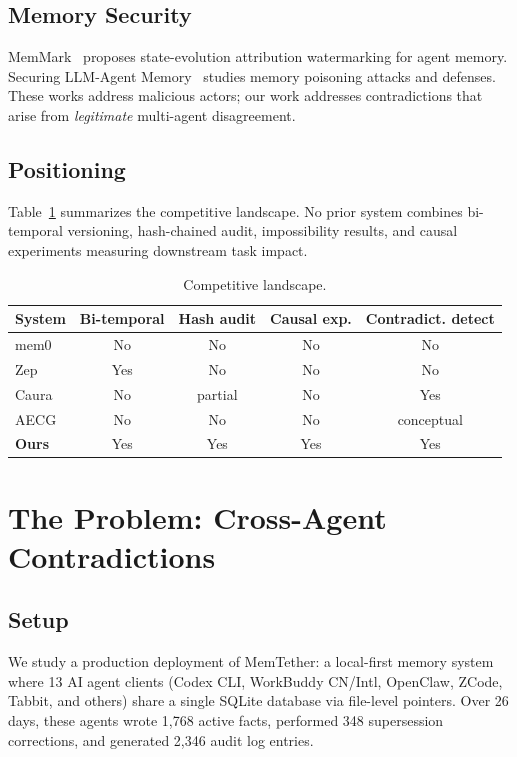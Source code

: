 \documentclass[sigconf]{acmart}
\begin{document}
\subsection{Memory Security}
MemMark~\cite{memmark} proposes state-evolution attribution watermarking for agent memory. Securing LLM-Agent Memory~\cite{poisoning} studies memory poisoning attacks and defenses. These works address malicious actors; our work addresses contradictions that arise from \emph{legitimate} multi-agent disagreement.

\subsection{Positioning}

Table~\ref{tab:positioning} summarizes the competitive landscape. No prior system combines bi-temporal versioning, hash-chained audit, impossibility results, and causal experiments measuring downstream task impact.

\begin{table}[h]
\centering
\small
\caption{Competitive landscape.}
\begin{tabular}{lcccc}
\toprule
System & Bi-temporal & Hash audit & Causal exp. & Contradict. detect \\
\midrule
mem0 & No & No & No & No \\
Zep & Yes & No & No & No \\
Caura & No & partial & No & Yes \\
AECG & No & No & No & conceptual \\
\textbf{Ours} & Yes & Yes & Yes & Yes \\
\bottomrule
\end{tabular}
\label{tab:positioning}
\end{table}

\section{The Problem: Cross-Agent Contradictions}
\label{sec:problem}

\subsection{Setup}

We study a production deployment of MemTether: a local-first memory system where 13 AI agent clients (Codex CLI, WorkBuddy CN/Intl, OpenClaw, ZCode, Tabbit, and others) share a single SQLite database via file-level pointers. Over 26 days, these agents wrote 1{,}768 active facts, performed 348 supersession corrections, and generated 2{,}346 audit log entries.
\end{document}
